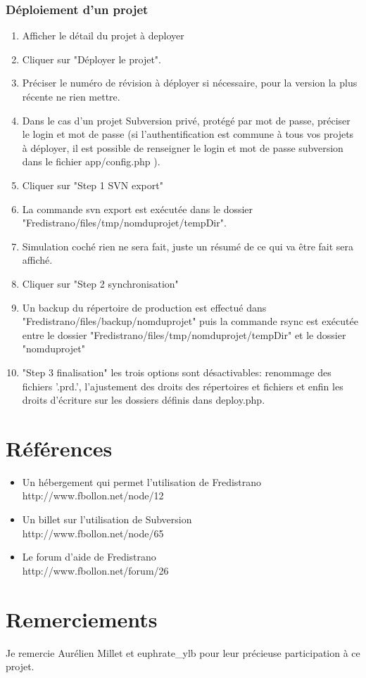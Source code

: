 \documentclass[12pt,a4paper]{report}
\begin{document}
\subsection{Déploiement d'un projet}
\begin{enumerate}
\item Afficher le détail du projet à deployer
\item Cliquer sur "Déployer le projet".
\item Préciser le numéro de révision à déployer si nécessaire, pour la version la plus récente ne rien mettre.
\item Dans le cas d'un projet Subversion privé, protégé par mot de passe, préciser le login et mot de passe (si l'authentification est commune à tous vos projets à déployer, il est possible de renseigner le login et mot de passe subversion dans le fichier app/config.php ).
\item Cliquer sur "Step 1 SVN export"
\item La commande svn export est exécutée dans le dossier "Fredistrano/files/tmp/nomduprojet/tempDir".
\item Simulation coché rien ne sera fait, juste un résumé de ce qui va être fait sera affiché.
\item Cliquer sur "Step 2 synchronisation"
\item Un backup du répertoire de production est effectué dans "Fredistrano/files/backup/nomduprojet" puis la commande rsync est exécutée entre le dossier "Fredistrano/files/tmp/nomduprojet/tempDir" et le dossier "nomduprojet"
\item "Step 3 finalisation" les trois options sont désactivables: renommage des fichiers '.prd.', l'ajustement des droits des répertoires et fichiers et enfin les droits d'écriture sur les dossiers définis dans deploy.php.
\end{enumerate}

\chapter{Références}
\begin{itemize}
\item Un hébergement qui permet l'utilisation de Fredistrano \\ http://www.fbollon.net/node/12 \\
\item Un billet sur l'utilisation de Subversion \\ http://www.fbollon.net/node/65 \\
\item Le forum d'aide de Fredistrano \\ http://www.fbollon.net/forum/26
\end{itemize}

\chapter{Remerciements}
Je remercie Aurélien Millet et euphrate\_ylb pour leur précieuse participation à ce projet.
\end{document}
